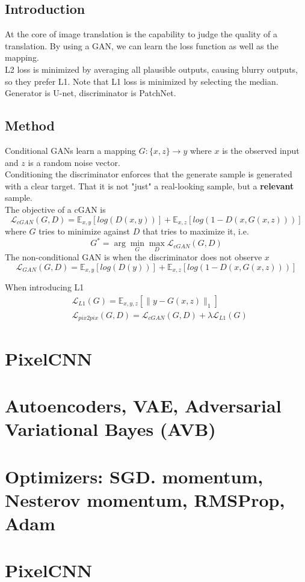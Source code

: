 \documentclass[../main.tex]{subfiles}
\begin{document}
\subsection{Introduction}
At the core of image translation is the capability to judge the quality of a translation. By using a GAN,
we can learn the loss function as well as the mapping. \\
L2 loss is minimized by averaging all plausible outputs, causing blurry outputs, so they prefer L1.
Note that L1 loss is minimized by selecting the median. \\
Generator is U-net, discriminator is PatchNet.

\subsection{Method}
Conditional GANs learn a mapping $G: \{x, z\} \rightarrow y$ where $x$ is the observed input and $z$
is a random noise vector. \\
Conditioning the discriminator enforces that the generate sample is generated with a clear target.
That it is not "just" a real-looking sample, but a \textbf{relevant} sample. \\
The objective of a cGAN is
\begin{equation}
    \mathcal{L}_{cGAN}(G, D) = \mathbb{E}_{x,y}[log(D(x,y))] + \mathbb{E}_{x,z}[log(1-D(x, G(x, z)))]
\end{equation}
where $G$ tries to minimize against $D$ that tries to maximize it, i.e.
\begin{equation}
    G^* = \arg \min_G \max_D \mathcal{L}_{cGAN}(G, D)
\end{equation}
The non-conditional GAN is when the discriminator does not observe $x$
\begin{equation}
    \mathcal{L}_{GAN}(G, D) = \mathbb{E}_{x,y}[log(D(y))] + \mathbb{E}_{x,z}[log(1-D(x, G(x, z)))]
\end{equation}

When introducing L1
\begin{align}
    &\mathcal{L}_{L1}(G) = \mathbb{E}_{x,y,z}[\|y - G(x, z)\|_1] \\
    &\mathcal{L}_{pix2pix}(G, D) = \mathcal{L}_{cGAN}(G, D) + \lambda \mathcal{L}_{L1}(G)
\end{align}


\section{PixelCNN}
\section{Autoencoders, VAE, Adversarial Variational Bayes (AVB)}
\section{Optimizers: SGD. momentum, Nesterov momentum, RMSProp, Adam}

\section{PixelCNN}
\end{document}
